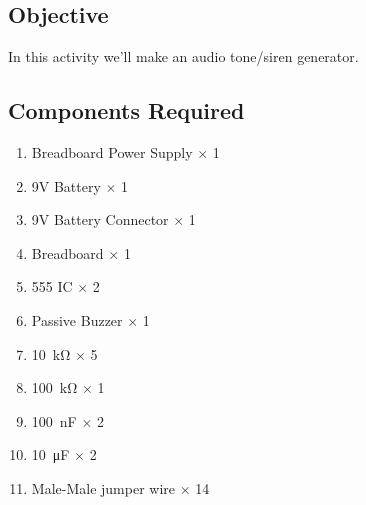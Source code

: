 \subsection{Objective}
In this activity we'll make an audio tone/siren generator.
\subsection{Components Required}
\begin{enumerate}
    \item Breadboard Power Supply $\times$ 1
    \item 9V Battery $\times$ 1
    \item 9V Battery Connector $\times$ 1
    \item Breadboard $\times$ 1
    \item 555 IC $\times$ 2
    \item Passive Buzzer $\times$ 1
    \item \SI{10}{\kilo\ohm} $\times$ 5
    \item \SI{100}{\kilo\ohm} $\times$ 1
    \item \SI{100}{\nano\farad} $\times$ 2
    \item \SI{10}{\micro\farad} $\times$ 2
    \item Male-Male jumper wire $\times$ 14
\end{enumerate}
